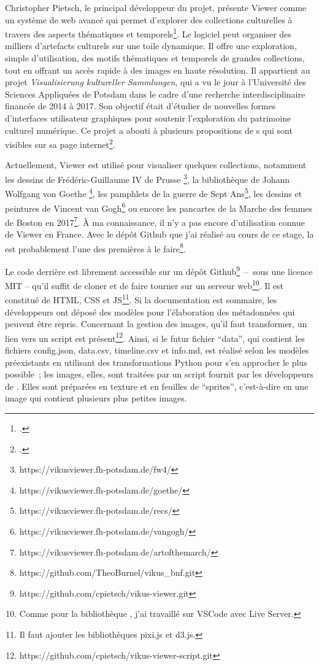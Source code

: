 Christopher Pietsch, le principal développeur du projet, présente  Viewer comme un système de  web avancé qui permet d'explorer des collections culturelles à travers des aspects thématiques et temporels\footcite{university_of_applied_sciences_potsdam_vikus_nodate}. Le logiciel peut organiser des milliers d'artefacts culturels sur une toile dynamique. Il offre une exploration, simple d’utilisation, des motifs thématiques et temporels de grandes collections, tout en offrant un accès rapide à des images en haute résolution. Il appartient au projet \textit{Visualisierung kultureller Sammlungen}, qui a vu le jour à l’Université des Sciences Appliquées de Potsdam dans le cadre d’une recherche interdisciplinaire financée de 2014 à 2017. Son objectif était d’étudier de nouvelles formes d'interfaces utilisateur graphiques pour soutenir l'exploration du patrimoine culturel numérique. Ce projet a abouti à plusieurs propositions de s qui sont visibles sur sa page internet\footcite{university_of_applied_sciences_potsdam_visualizing_nodate}.\par
Actuellement,  Viewer est utilisé pour visualiser quelques collections, notamment les dessins de Frédéric-Guillaume IV de Prusse \footnote{https://vikusviewer.fh-potsdam.de/fw4/}, la bibliothèque de Johann Wolfgang von Goethe \footnote{https://vikusviewer.fh-potsdam.de/goethe/}, les pamphlets de la guerre de Sept Ans\footnote{https://vikusviewer.fh-potsdam.de/recs/}, les dessins et peintures de Vincent van Gogh\footnote{https://vikusviewer.fh-potsdam.de/vangogh/} ou encore les pancartes de la Marche des femmes de Boston en 2017\footnote{https://vikusviewer.fh-potsdam.de/artofthemarch/}​. À ma connaissance, il n’y a pas encore d’utilisation connue de  Viewer en France. Avec le dépôt Github que j’ai réalisé au cours de ce stage, la  est probablement l’une des premières à le faire\footnote{https://github.com/TheoBurnel/vikus\_bnf.git}.\\\par
Le code derrière  est librement accessible sur un dépôt Github\footnote{ https://github.com/cpietsch/vikus-viewer.git}~–~sous une licence MIT – qu’il suffit de cloner et de faire tourner sur un serveur web\footnote{Comme pour la bibliothèque , j’ai travaillé sur VSCode avec Live Server.}. Il est constitué de HTML, CSS et JS\footnote{Il faut ajouter les bibliothèques pixi.js et d3.js.}. Si la documentation est sommaire, les développeurs ont déposé des modèles pour l’élaboration des métadonnées qui peuvent être repris. Concernant la gestion des images, qu’il faut transformer, un lien vers un script est présent\footnote{https://github.com/cpietsch/vikus-viewer-script.git}. Ainsi, si le futur fichier \enquote{data}, qui contient les fichiers config.json, data.csv, timeline.csv et info.md, est réalisé selon les modèles préexistants en utilisant des transformations Python pour s’en approcher le plus possible~; les images, elles, sont traitées par un script fournit par les développeurs de . Elles sont préparées en texture et en feuilles de \enquote{sprites}, c’est-à-dire en une image qui contient plusieurs plus petites images.\par

